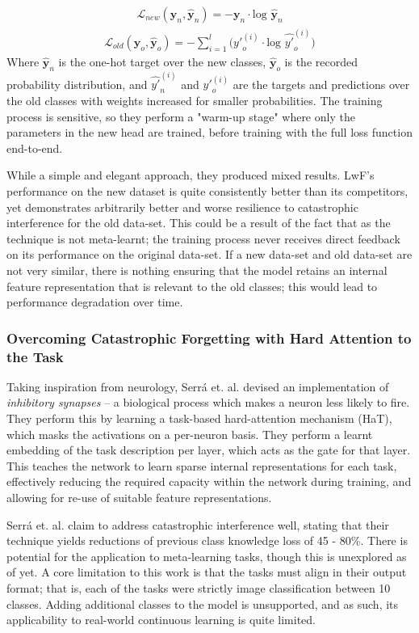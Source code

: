 \documentclass{report}
\begin{document}
\begin{align} \label{eqn:lwf:1}
 \mathcal{L}_{new}(\bm{y}_n,\hat{\bm{y}}_n) = -\bm{y}_n \cdot \text{log } \bm{\hat{y}}_n
\end{align}
\begin{align} \label{eqn:lwf:2}
 \mathcal{L}_{old}(\bm{y}_o,\hat{\bm{y}}_o) = -\sum_{i=1}^{l}\big( {y'}_{o}^{(i)} \cdot \text{log } \hat{y'}_o^{(i)}\big)
\end{align}
Where $\bm{\hat{y}}_n$ is the one-hot target over the new classes, $\bm{\hat{y}}_o$ is the recorded probability distribution, and $\hat{y'}_n^{(i)}$ and ${y'}_{o}^{(i)}$ are the targets and predictions over the old classes with weights increased for smaller probabilities. The training process is sensitive, so they perform a "warm-up stage" where only the parameters in the new head are trained, before training with the full loss function end-to-end. \par
While a simple and elegant approach, they produced mixed results. LwF's performance on the new dataset is quite consistently better than its competitors, yet demonstrates arbitrarily better and worse resilience to catastrophic interference for the old data-set. This could be a result of the fact that as the technique is not meta-learnt; the training process never receives direct feedback on its performance on the original data-set. If a new data-set and old data-set are not very similar, there is nothing ensuring that the model retains an internal feature representation that is relevant to the old classes; this would lead to performance degradation over time. \par

\subsubsection{Overcoming Catastrophic Forgetting with Hard Attention to the Task}
Taking inspiration from neurology, Serr\'a et. al. \parencite{hat} devised an implementation of \emph{inhibitory synapses} -- a biological process which makes a neuron less likely to fire. They perform this by learning a task-based hard-attention mechanism (HaT), which masks the activations on a per-neuron basis. They perform a learnt embedding of the task description per layer, which acts as the gate for that layer. This teaches the network to learn sparse internal representations for each task, effectively reducing the required capacity within the network during training, and allowing for re-use of suitable feature representations. \par
Serr\'a et. al. claim to address catastrophic interference well, stating that their technique yields reductions of previous class knowledge loss of 45 - 80\%. There is potential for the application to meta-learning tasks, though this is unexplored as of yet. A core limitation to this work is that the tasks must align in their output format; that is, each of the tasks were strictly image classification between 10 classes. Adding additional classes to the model is unsupported, and as such, its applicability to real-world continuous learning is quite limited. \par
\end{document}
